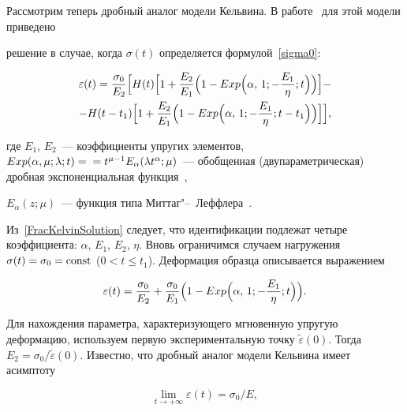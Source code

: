 \documentclass[11pt,a4paper,twoside]{article}
\begin{document}
Рассмотрим теперь дробный аналог модели Кельвина. В работе~\cite{OgoRadUng16} для этой модели приведено


решение в случае, когда $\sigma(t)$ определяется формулой~\eqref{sigma0}:


\begin{multline}


\label{FracKelvinSolution}


\varepsilon(t)=\frac{\sigma_{0}}{E_{2}}\Bigl[H(t)\Bigl[1+\frac{E_{2}}{E_{1}}\Bigl(1-Exp\Bigl(\alpha,\,1;-\frac{E_{1}}{\eta};t\Bigl)\Bigr)\Bigr]-\\


-H(t-t_{1})\Bigl[1+\frac{E_{2}}{E_{1}}\Bigr(1-Exp\Bigl(\alpha,\,1;-\frac{E_{1}}{\eta};t-t_{1}\Bigl)\Bigr)\Bigr]\Bigr],


\end{multline}


где $E_{1}$, $E_{2}$~--- коэффициенты упругих элементов, $Exp(\alpha,\mu;\lambda;t)=\\=t^{\mu-1}E_{\alpha}(\lambda t^{\alpha};\mu)$~--- обобщенная (двупараметрическая) дробная экспоненциальная функция~\cite{Ogorodnikov_Some_Special_Functions}, 


 $E_{\alpha}(z;\mu)$~--- функция типа Миттаг"--~Леффлера~\cite{Djrbashyan1966}. 





Из~\eqref{FracKelvinSolution} следует, что идентификации подлежат четыре коэффициента: $\alpha$, $E_{1}$, $E_{2}$, $\eta$. Вновь ограничимся случаем нагружения $\sigma(t)=\sigma_{0}=\rm const$ ($0<t\leq t_{1}$). Деформация образца описывается выражением


\begin{equation}


\label{FracKelvinSolution2}


\varepsilon(t)=\frac{\sigma_{0}}{E_{2}}+\frac{\sigma_{0}}{E_{1}}\Bigl(1-Exp\Bigl(\alpha,\,1;-\frac{E_{1}}{\eta};t\Bigl)\Bigr).


\end{equation}


Для нахождения параметра, характеризующего мгновенную упругую деформацию, используем первую экспериментальную точку $\tilde{\varepsilon}(0)$. Тогда $E_{2}=\sigma_{0}/\tilde{\varepsilon}(0)$. Известно, что дробный аналог модели Кельвина имеет асимптоту~\cite{OgoRadUng16}


\begin{equation*} 


\lim_{t\to+\infty}\varepsilon(t)={\sigma_{0}}/{E},


\end{equation*}
\end{document}
